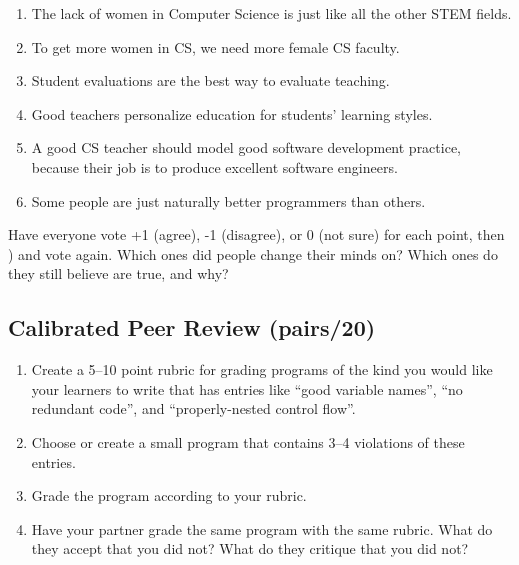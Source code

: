 \begin{enumerate}
\item
  The lack of women in Computer Science is just like all the other
  STEM fields.
\item
  To get more women in CS, we need more female CS faculty.
\item
  Student evaluations are the best way to evaluate teaching.
\item
  Good teachers personalize education for students' learning styles.
\item
  A good CS teacher should model good software development practice,
  because their job is to produce excellent software engineers.
\item
  Some people are just naturally better programmers than others.
\end{enumerate}

Have everyone vote +1 (agree), -1 (disagree), or 0 (not sure) for each
point, then ) and vote again. Which ones did people change
their minds on? Which ones do they still believe are true, and why?

\subsection*{Calibrated Peer Review (pairs/20)}

\begin{enumerate}
\item
  Create a 5--10 point rubric for grading programs of the kind you
  would like your learners to write that has entries like ``good
  variable names'', ``no redundant code'', and ``properly-nested control
  flow''.
\item
  Choose or create a small program that contains 3--4 violations of
  these entries.
\item
  Grade the program according to your rubric.
\item
  Have your partner grade the same program with the same rubric. What
  do they accept that you did not? What do they critique that you did
  not?
\end{enumerate}
